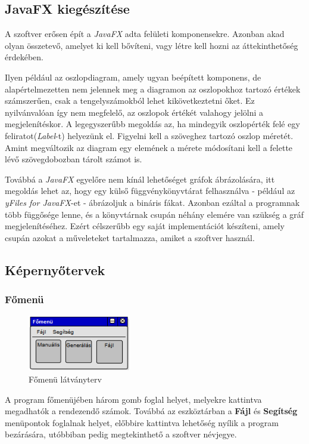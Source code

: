 \documentclass{elteikthesis}
\begin{document}
\subsection{JavaFX kiegészítése}
A szoftver erősen épít a \emph{JavaFX} adta felületi komponensekre. Azonban akad olyan összetevő, amelyet ki kell bővíteni, vagy létre kell hozni az áttekinthetőség érdekében.\par
Ilyen például az oszlopdiagram, amely ugyan beépített komponens, de alapértelmezetten nem jelennek meg a diagramon az oszlopokhoz tartozó értékek számszerűen, csak a tengelyszámokból lehet kikövetkeztetni őket. Ez nyilvánvalóan így nem megfelelő, az oszlopok értékét valahogy jelölni a megjelenítéskor. A legegyszerűbb megoldás az, ha mindegyik oszlopérték felé egy feliratot(\emph{Label}-t) helyezünk el. Figyelni kell a szöveghez tartozó oszlop méretét. Amint megváltozik az diagram egy elemének a mérete módosítani kell a felette lévő szövegdobozban tárolt számot is.\par
Továbbá a \emph{JavaFX} egyelőre nem kínál lehetőséget gráfok ábrázolására, itt megoldás lehet az, hogy egy külső függvénykönyvtárat felhasználva - például az \emph{yFiles for JavaFX}-et -  ábrázoljuk a bináris fákat. Azonban ezáltal a programnak több függősége lenne, és a könyvtárnak csupán néhány elemére van szükség a gráf megjelenítéséhez. Ezért célszerűbb egy saját implementációt készíteni, amely csupán azokat a műveleteket tartalmazza, amiket a szoftver használ.

\subsection{Képernyőtervek}
\subsubsection{Főmenü}
\begin{figure}[H]
	\centering
	\includegraphics[width=0.4\textwidth]{pics/plan_mainmenu.png}
	\caption{Főmenü látványterv}
\end{figure}\par
A program főmenüjében három gomb foglal helyet, melyekre kattintva megadhatók a rendezendő számok. Továbbá az eszköztárban a \textbf{Fájl} és \textbf{Segítség} menüpontok foglalnak helyet, előbbire kattintva lehetőség nyílik a program bezárására, utóbbiban pedig megtekinthető a szoftver névjegye.
\end{document}
